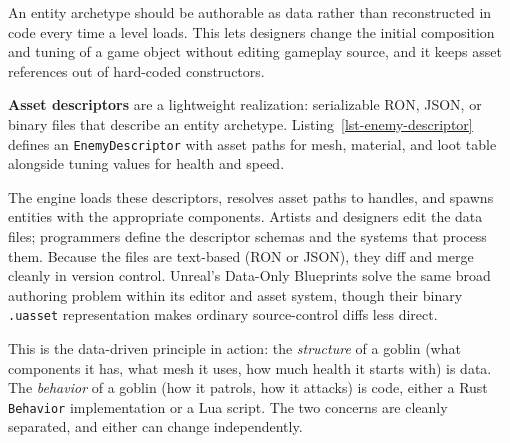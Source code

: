 \documentclass[
  11pt,
  letterpaper,
  DIV=11,
  numbers=noendperiod,
  twoside,
  open=right]{scrreprt}
\newenvironment{Shaded}{}{}
\newcommand{\CommentTok}[1]{\textcolor[rgb]{0.42,0.45,0.49}{#1}}
\newcommand{\DataTypeTok}[1]{\textcolor[rgb]{0.84,0.23,0.29}{#1}}
\newcommand{\KeywordTok}[1]{\textcolor[rgb]{0.84,0.23,0.29}{#1}}
\newcommand{\NormalTok}[1]{\textcolor[rgb]{0.14,0.16,0.18}{#1}}
\newcommand{\OperatorTok}[1]{\textcolor[rgb]{0.14,0.16,0.18}{#1}}
\renewenvironment{Shaded}{\begin{snugshade}\small\setstretch{0.95}}{\end{snugshade}}
\begin{document}
An entity archetype should be authorable as data rather than
reconstructed in code every time a level loads. This lets designers
change the initial composition and tuning of a game object without
editing gameplay source, and it keeps asset references out of hard-coded
constructors.

\textbf{Asset descriptors} are a lightweight realization: serializable
RON, JSON, or binary files that describe an entity archetype.
Listing~\ref{lst-enemy-descriptor} defines an \texttt{EnemyDescriptor}
with asset paths for mesh, material, and loot table alongside tuning
values for health and speed.

\begin{codelisting}

\caption{\label{lst-enemy-descriptor}A serializable descriptor for an
enemy archetype}

\centering{

\begin{Shaded}
\begin{Highlighting}[]
\KeywordTok{struct}\NormalTok{ EnemyDescriptor }\OperatorTok{\{}
\NormalTok{  mesh}\OperatorTok{:}\NormalTok{       AssetPath}\OperatorTok{,}       \CommentTok{// "meshes/goblin.glb"}
\NormalTok{  material}\OperatorTok{:}\NormalTok{   AssetPath}\OperatorTok{,}       \CommentTok{// "materials/goblin.ron"}
\NormalTok{  health}\OperatorTok{:}     \DataTypeTok{f32}\OperatorTok{,}
\NormalTok{  speed}\OperatorTok{:}      \DataTypeTok{f32}\OperatorTok{,}
\NormalTok{  loot\_table}\OperatorTok{:}\NormalTok{ AssetPath}\OperatorTok{,}
\OperatorTok{\}}
\end{Highlighting}
\end{Shaded}

}

\end{codelisting}%

The engine loads these descriptors, resolves asset paths to handles, and
spawns entities with the appropriate components. Artists and designers
edit the data files; programmers define the descriptor schemas and the
systems that process them. Because the files are text-based (RON or
JSON), they diff and merge cleanly in version control. Unreal's
Data-Only Blueprints solve the same broad authoring problem within its
editor and asset system, though their binary \texttt{.uasset}
representation makes ordinary source-control diffs less direct.

This is the data-driven principle in action: the \emph{structure} of a
goblin (what components it has, what mesh it uses, how much health it
starts with) is data. The \emph{behavior} of a goblin (how it patrols,
how it attacks) is code, either a Rust \texttt{Behavior} implementation
or a Lua script. The two concerns are cleanly separated, and either can
change independently.
\end{document}
